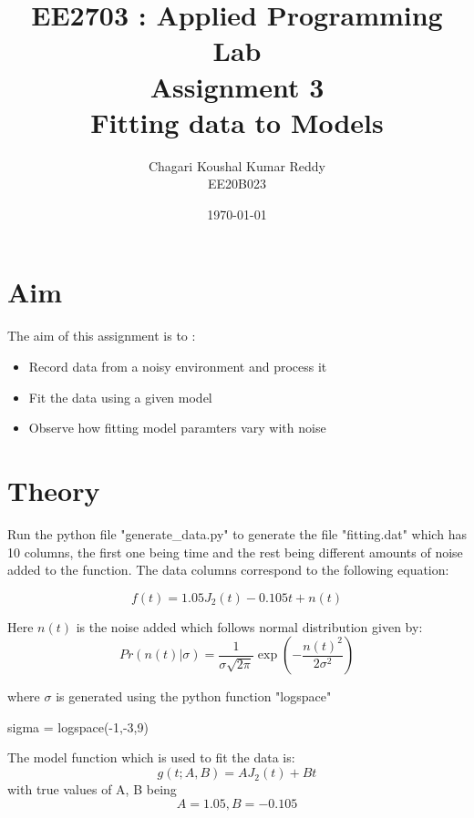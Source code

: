 \documentclass[12pt, a4paper]{report}
\title{\textbf{EE2703 : Applied Programming Lab \\ Assignment 3 \\ Fitting data to Models}}
\author{Chagari Koushal Kumar Reddy \\ EE20B023} %
\date{\today} %
\begin{document}
		
		
\maketitle %
\section*{Aim}
The aim of this assignment is to :
\begin{itemize}
    \item Record data from a noisy environment and process it
    \item Fit the data using a given model
    \item Observe how fitting model paramters vary with noise
\end{itemize}

\section*{Theory}
Run the python file "generate\_data.py" to generate the file 
"fitting.dat" which has 10 columns, the first one being time and the rest being different amounts of noise added to the function. 
The data columns correspond to the following equation:

    \begin{equation}\label{eq:1}
    f(t) = 1.05J_{2}(t)-0.105t+n(t)
    \end{equation}

Here $n(t)$ is the noise added which
follows normal distribution given by:\\
    \begin{equation*}
        Pr(n(t)|\sigma) = \frac{1}{\sigma \sqrt{2 \pi}} \exp(- \frac{n(t)^2}{2 \sigma ^2})
    \end{equation*}

where $\sigma$ is generated using the python function "logspace"
 
    \begin{psudo}
    sigma = logspace(-1,-3,9)\end{psudo}
 
The model function which is used to fit the data is:
    \begin{equation}\label{eq2}
        g(t;A,B) = AJ_{2}(t) + Bt
    \end{equation}
with true values of A, B being
    \begin{equation*}
        A = 1.05,  B = -0.105
    \end{equation*}
\end{document}
